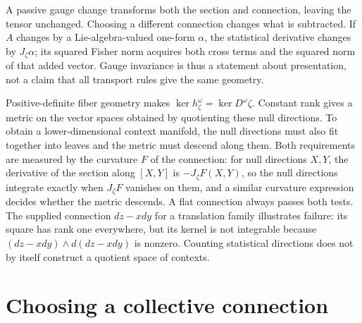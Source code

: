 A passive gauge change transforms both the section and connection, leaving the tensor unchanged. Choosing a different connection changes what is subtracted. If $A$ changes by a Lie-algebra-valued one-form $\alpha$, the statistical derivative changes by $J_\zeta\alpha$; its squared Fisher norm acquires both cross terms and the squared norm of that added vector. Gauge invariance is thus a statement about presentation, not a claim that all transport rules give the same geometry.

Positive-definite fiber geometry makes $\ker h^\omega_\zeta=\ker D^\omega\zeta$. Constant rank gives a metric on the vector spaces obtained by quotienting these null directions. To obtain a lower-dimensional context manifold, the null directions must also fit together into leaves and the metric must descend along them. Both requirements are measured by the curvature $F$ of the connection: for null directions $X,Y$, the derivative of the section along $[X,Y]$ is $-J_\zeta F(X,Y)$, so the null directions integrate exactly when $J_\zeta F$ vanishes on them, and a similar curvature expression decides whether the metric descends. A flat connection always passes both tests. The supplied connection $dz-x dy$ for a translation family illustrates failure: its square has rank one everywhere, but its kernel is not integrable because $(dz-x dy)\wedge d(dz-x dy)$ is nonzero. Counting statistical directions does not by itself construct a quotient space of contexts.

\section{Choosing a collective connection}

